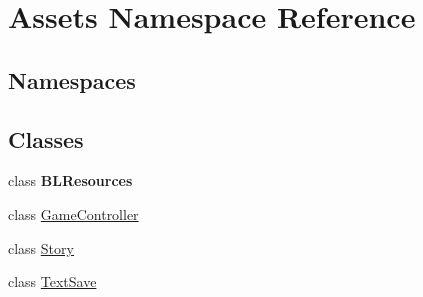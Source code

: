 \hypertarget{namespaceAssets}{}\section{Assets Namespace Reference}
\label{namespaceAssets}
\subsection*{Namespaces}
\begin{DoxyCompactItemize}
\end{DoxyCompactItemize}
\subsection*{Classes}
\begin{DoxyCompactItemize}
\item 
class {\bfseries B\+L\+Resources}
\item 
class \hyperlink{classAssets_1_1GameController}{Game\+Controller}
\item 
class \hyperlink{classAssets_1_1Story}{Story}
\item 
class \hyperlink{classAssets_1_1TextSave}{Text\+Save}
\end{DoxyCompactItemize}
